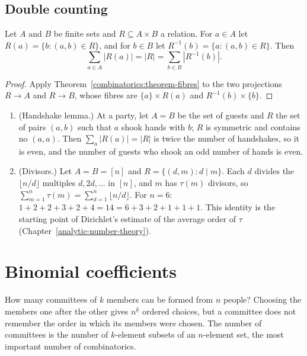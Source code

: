 \subsection{Double counting}\label{combinatorics:subsection-double-counting}

\begin{proposition}\label{combinatorics:proposition-double-counting}
Let $A$ and $B$ be finite sets and $R \subseteq A \times B$ a relation. For $a \in A$ let $R(a) = \{b : (a, b) \in R\}$, and for $b \in B$ let $R^{-1}(b) = \{a : (a, b) \in R\}$. Then
\[
\sum_{a \in A}|R(a)| = |R| = \sum_{b \in B}|R^{-1}(b)|.
\]
\end{proposition}

\begin{proof}
Apply Theorem~\ref{combinatorics:theorem-fibres} to the two projections $R \to A$ and $R \to B$, whose fibres are $\{a\} \times R(a)$ and $R^{-1}(b) \times \{b\}$.
\end{proof}

\begin{example}\label{combinatorics:example-handshake}
\begin{enumerate}
\item (Handshake lemma.) At a party, let $A = B$ be the set of guests and $R$ the set of pairs $(a, b)$ such that $a$ shook hands with $b$; $R$ is symmetric and contains no $(a, a)$. Then
$\sum_a|R(a)| = |R|$ is twice the number of handshakes, so it is even, and the number of guests who shook an odd number of hands is even.
\item (Divisors.) Let $A = B = [n]$ and $R = \{(d, m) : d \mid m\}$. Each $d$ divides the $\lfloor n/d \rfloor$ multiples $d, 2d, \ldots$ in $[n]$, and $m$ has $\tau(m)$ divisors, so
$\sum_{m=1}^{n}\tau(m) = \sum_{d=1}^{n}\lfloor n/d \rfloor$. For $n = 6$: $1 + 2 + 2 + 3 + 2 + 4 = 14 = 6 + 3 + 2 + 1 + 1 + 1$. This identity is the starting point of Dirichlet's estimate of the
average order of $\tau$ (Chapter~\ref{analytic-number-theory}).
\end{enumerate}
\end{example}

\section{Binomial coefficients}\label{combinatorics:section-binomial}

How many committees of $k$ members can be formed from $n$ people? Choosing the members one after the other gives $n^{\underline{k}}$ ordered choices, but a committee does not remember the order in which its
members were chosen. The number of committees is the number of $k$-element subsets of an $n$-element set, the most important number of combinatorics.

